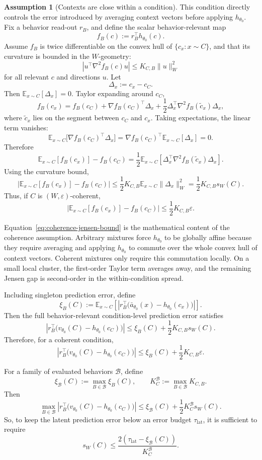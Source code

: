 \documentclass[11pt]{article}
\theoremstyle{definition}
\theoremstyle{definition}
\theoremstyle{assumptionstyle}
\newtheorem{assumption}{Assumption}[section]
\newcounter{prediction}
\newcommand{\E}{\mathbb{E}}            %
\begin{document}
\begin{assumption}[Contexts are close within a condition]
This condition directly controls the error introduced by averaging context
vectors before applying \(h_{\theta_0}\). Fix a behavior read-out \(r_B\), and
define the scalar behavior-relevant map
\[
f_B(c):=r_B^\top h_{\theta_0}(c).
\]
Assume \(f_B\) is twice differentiable on the convex hull of
\(\{c_x:x\sim C\}\), and that its curvature is bounded in the \(W\)-geometry:
\[
\left|
u^\top\nabla^2 f_B(c)u
\right|
\le
K_{C,B}\|u\|_W^2
\]
for all relevant \(c\) and directions \(u\). Let
\[
\Delta_x:=c_x-c_C.
\]
Then \(\E_{x\sim C}[\Delta_x]=0\). Taylor expanding around \(c_C\),
\[
f_B(c_x)
=
f_B(c_C)
+
\nabla f_B(c_C)^\top\Delta_x
+
\frac12
\Delta_x^\top
\nabla^2 f_B(\widetilde c_x)
\Delta_x,
\]
where \(\widetilde c_x\) lies on the segment between \(c_C\) and \(c_x\). Taking
expectations, the linear term vanishes:
\[
\E_{x\sim C}\big[\nabla f_B(c_C)^\top\Delta_x\big]
=
\nabla f_B(c_C)^\top\E_{x\sim C}[\Delta_x]
=
0.
\]
Therefore
\[
\E_{x\sim C}[f_B(c_x)]-f_B(c_C)
=
\frac12
\E_{x\sim C}
\left[
\Delta_x^\top
\nabla^2 f_B(\widetilde c_x)
\Delta_x
\right].
\]
Using the curvature bound,
\[
\left|
\E_{x\sim C}[f_B(c_x)]
-
f_B(c_C)
\right|
\le
\frac12
K_{C,B}
\E_{x\sim C}\|\Delta_x\|_W^2
=
\frac12K_{C,B}s_W(C).
\]
Thus, if \(C\) is \((W,\varepsilon)\)-coherent,
\[
\left|
\E_{x\sim C}[f_B(c_x)]
-
f_B(c_C)
\right|
\le
\frac12K_{C,B}\varepsilon.
\tag{2}
\label{eq:coherence-jensen-bound}
\]

Equation~\eqref{eq:coherence-jensen-bound} is the mathematical content of the
coherence assumption. Arbitrary mixtures force \(h_{\theta_0}\) to be globally
affine because they require averaging and applying \(h_{\theta_0}\) to commute
over the whole convex hull of context vectors. Coherent mixtures only require
this commutation locally. On a small local cluster, the first-order Taylor term
averages away, and the remaining Jensen gap is second-order in the
within-condition spread.

Including singleton prediction error, define
\[
\xi_B(C)
:=
\E_{x\sim C}
\left[
\left|
r_B^\top
\big(
\bar a_{\theta_0}(x)-h_{\theta_0}(c_x)
\big)
\right|
\right].
\]
Then the full behavior-relevant condition-level prediction error satisfies
\[
\left|
r_B^\top
\big(
v_{\theta_0}(C)-h_{\theta_0}(c_C)
\big)
\right|
\le
\xi_B(C)
+
\frac12K_{C,B}s_W(C).
\]
Therefore, for a coherent condition,
\[
\left|
r_B^\top
\big(
v_{\theta_0}(C)-h_{\theta_0}(c_C)
\big)
\right|
\le
\xi_B(C)
+
\frac12K_{C,B}\varepsilon.
\]

For a family of evaluated behaviors \(\mathcal B\), define
\[
\xi_{\mathcal B}(C):=\max_{B\in\mathcal B}\xi_B(C),
\qquad
K_C^{\mathcal B}:=\max_{B\in\mathcal B}K_{C,B}.
\]
Then
\[
\max_{B\in\mathcal B}
\left|
r_B^\top
\big(
v_{\theta_0}(C)-h_{\theta_0}(c_C)
\big)
\right|
\le
\xi_{\mathcal B}(C)
+
\frac12K_C^{\mathcal B}s_W(C).
\]
So, to keep the latent prediction error below an error budget
\(\tau_{\mathrm{lat}}\), it is sufficient to require
\[
s_W(C)
\le
\frac{2(\tau_{\mathrm{lat}}-\xi_{\mathcal B}(C))}
     {K_C^{\mathcal B}}.
\]


\end{assumption}
\end{document}

